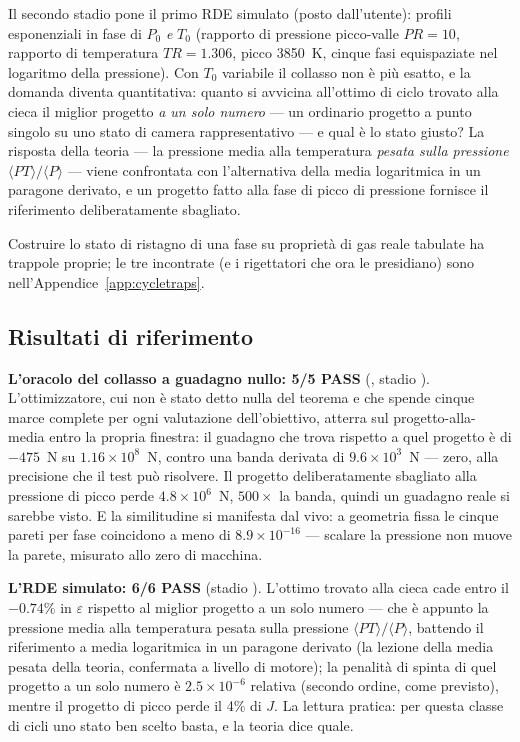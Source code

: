 Il secondo stadio pone il primo RDE simulato (posto dall'utente):
profili esponenziali in fase di $P_0$ \emph{e} $T_0$ (rapporto di
pressione picco-valle $PR = 10$, rapporto di temperatura
$TR = 1.306$, picco 3850~K, cinque fasi equispaziate nel logaritmo
della pressione). Con $T_0$ variabile il collasso non è più esatto, e
la domanda diventa quantitativa: quanto si avvicina all'ottimo di
ciclo trovato alla cieca il miglior progetto \emph{a un solo numero}
--- un ordinario progetto a punto singolo su uno stato di camera
rappresentativo --- e qual è lo stato giusto? La risposta della
teoria --- la pressione media alla temperatura \emph{pesata sulla
pressione} $\langle P T\rangle/\langle P\rangle$ --- viene
confrontata con l'alternativa della media logaritmica in un paragone
derivato, e un progetto fatto alla fase di picco di pressione
fornisce il riferimento deliberatamente sbagliato.

Costruire lo stato di ristagno di una fase su proprietà di gas reale
tabulate ha trappole proprie; le tre incontrate (e i rigettatori che
ora le presidiano) sono nell'Appendice~\ref{app:cycletraps}.

\subsection{Risultati di riferimento}

\textbf{L'oracolo del collasso a guadagno nullo: 5/5 PASS}
(, stadio ).
L'ottimizzatore, cui non è stato detto nulla del teorema e che spende
cinque marce complete per ogni valutazione dell'obiettivo, atterra
sul progetto-alla-media entro la propria finestra: il guadagno che
trova rispetto a quel progetto è di $-475$~N su
$1.16\times10^{8}$~N, contro una banda derivata di
$9.6\times10^{3}$~N --- zero, alla precisione che il test può
risolvere. Il progetto deliberatamente sbagliato alla pressione di
picco perde $4.8\times10^{6}$~N, $500\times$ la banda, quindi un
guadagno reale si sarebbe visto. E la similitudine si manifesta dal
vivo: a geometria fissa le cinque pareti per fase coincidono a meno
di $8.9\times10^{-16}$ --- scalare la pressione non muove la parete,
misurato allo zero di macchina.

\textbf{L'RDE simulato: 6/6 PASS} (stadio ). L'ottimo
trovato alla cieca cade entro il $-0.74\%$ in $\varepsilon$ rispetto
al miglior progetto a un solo numero --- che è appunto la pressione
media alla temperatura pesata sulla pressione
$\langle PT\rangle/\langle P\rangle$, battendo il riferimento a media
logaritmica in un paragone derivato (la lezione della media pesata
della teoria, confermata a livello di motore); la penalità di spinta
di quel progetto a un solo numero è $2.5\times10^{-6}$ relativa
(secondo ordine, come previsto), mentre il progetto di picco perde il
4\% di $J$. La lettura pratica: per questa classe di cicli uno stato
ben scelto basta, e la teoria dice quale.

